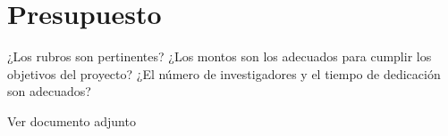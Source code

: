 \documentclass[11pt]{article}
\begin{document}











\section{ Presupuesto}
\begin{instrucciones}
  ¿Los rubros son pertinentes? ¿Los montos son los adecuados para cumplir los objetivos del proyecto? ¿El número de investigadores y el tiempo de dedicación son adecuados?
\end{instrucciones}
Ver documento adjunto


\end{document}
